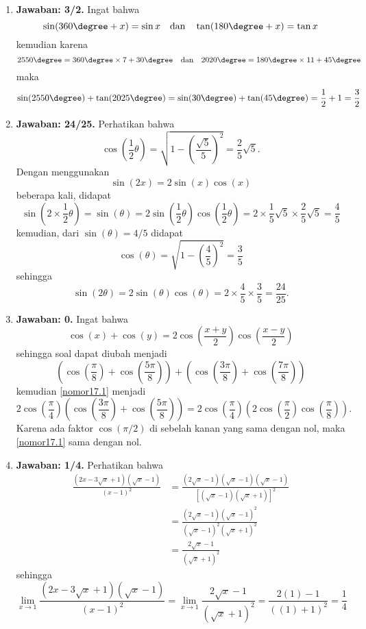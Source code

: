 \begin{enumerate}
\item \textbf{Jawaban: 3/2.} Ingat bahwa \[\sin(360\degree + x) = \sin x\quad\text{dan}\quad\tan(180\degree +x) = \tan x\]kemudian karena\[2550\degree = 360\degree\times7 + 30\degree\quad\text{dan}\quad2020\degree = 180\degree\times11 + 45\degree\]maka\[\sin(2550\degree) + \tan(2025\degree) = \sin(30\degree) + \tan(45\degree) = \frac{1}{2} + 1 = \frac{3}{2}\]

\item \textbf{Jawaban: 24/25.} Perhatikan bahwa \[\cos\left(\frac{1}{2}\theta\right) = \sqrt{1-\left(\frac{\sqrt{5}}{5}\right)^2} = \frac{2}{5}\sqrt{5}.\] Dengan menggunakan \[\sin(2x) = 2\sin(x)\cos(x)\] beberapa kali, didapat \[\sin\left(2\times\frac{1}{2}\theta\right) = \sin(\theta) =2\sin\left(\frac{1}{2}\theta\right)\cos\left(\frac{1}{2}\theta\right) = 2\times\frac{1}{5}\sqrt{5}\times\frac{2}{5}\sqrt{5} = \frac{4}{5}\]kemudian, dari $\sin(\theta) = 4/5$ didapat \[\cos(\theta) = \sqrt{1-\left(\frac{4}{5}\right)^2} = \frac{3}{5}\]sehingga \[\sin(2\theta) = 2\sin(\theta)\cos(\theta) = 2\times\frac{4}{5}\times\frac{3}{5} = \frac{24}{25}.\]

\item \textbf{Jawaban: 0.} Ingat bahwa \[\cos(x) + \cos(y) = 2\cos\left(\frac{x+y}{2}\right)\cos\left(\frac{x-y}{2}\right)\]sehingga soal dapat diubah menjadi \begin{equation}\label{nomor17.1}\left(\cos\left(\frac{\pi}{8}\right) + \cos\left(\frac{5\pi}{8}\right)\right) + \left(\cos\left(\frac{3\pi}{8}\right)+\cos\left(\frac{7\pi}{8}\right)\right)\end{equation}kemudian \eqref{nomor17.1} menjadi
	\[
	2\cos\left(\frac{\pi}{4}\right)\left(\cos\left(\frac{3\pi}{8}\right)+\cos\left(\frac{5\pi}{8}\right)\right)=2\cos\left(\frac{\pi}{4}\right)\left(2\cos\left(\frac{\pi}{2}\right)	\cos\left(\frac{\pi}{8}\right)\right).
	\]
Karena ada faktor $\cos\left(\pi/2\right)$ di sebelah kanan yang sama dengan nol, maka \eqref{nomor17.1} sama dengan nol.

\item \textbf{Jawaban: 1/4.} Perhatikan bahwa
\begin{align*}
\frac{(2x-3\sqrt{x} +1)(\sqrt{x}-1)}{(x-1)^2} &= \frac{(2\sqrt{x}-1)(\sqrt{x}-1)(\sqrt{x}-1)}{\left[(\sqrt{x}-1)(\sqrt{x}+1)\right]^2}\\
							 &= \frac{(2\sqrt{x}-1)(\sqrt{x}-1)^2}{(\sqrt{x}-1)^2(\sqrt{x}+1)^2}\\
							 &= \frac{2\sqrt{x}-1}{(\sqrt{x}+1)^2}
\end{align*}
sehingga \[\lim_{x\to1}\frac{(2x-3\sqrt{x} +1)(\sqrt{x}-1)}{(x-1)^2} = \lim_{x\to1}\frac{2\sqrt{x}-1}{(\sqrt{x}+1)^2} = \frac{2(1)-1}{((1)+1)^2} = \frac{1}{4}\]


\end{enumerate}
